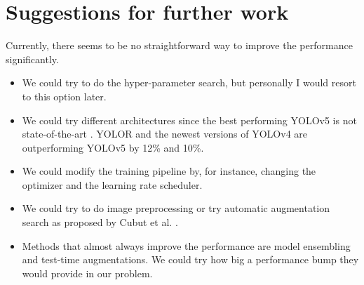 \section{Suggestions for further work}
Currently, there seems to be no straightforward way to improve the performance significantly.

\begin{itemize}
    \item We could try to do the hyper-parameter search, but personally I would resort to this option later.

    \item We could try different architectures since the best performing YOLOv5 is not state-of-the-art \cite{paperwithcode}. YOLOR and the newest versions of YOLOv4 are outperforming YOLOv5 by 12\% and 10\%.

    \item We could modify the training pipeline by, for instance, changing the optimizer and the learning rate scheduler.

    \item We could try to do image preprocessing or try automatic augmentation search as proposed by Cubut et al. \cite{Cubuk2018}.

    \item Methods that almost always improve the performance are model ensembling and test-time augmentations. We could try how big a performance bump they would provide in our problem.
\end{itemize}